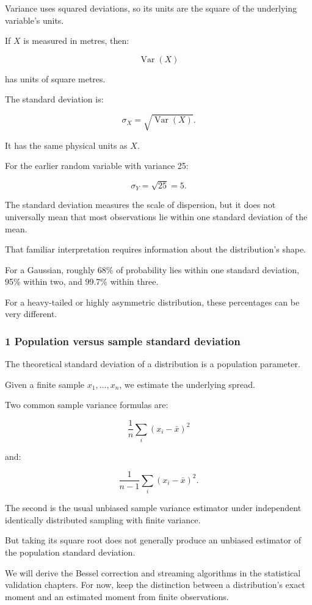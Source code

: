 Variance uses squared deviations, so its units are the square of the underlying variable's units.

If \(X\) is measured in metres, then:

\[
 \operatorname{Var}(X)
\]

has units of square metres.

The standard deviation is:

\[
 \boxed{ \sigma_X=\sqrt{\operatorname{Var}(X)} }.
\]

It has the same physical units as \(X\).

For the earlier random variable with variance 25:

\[
 \sigma_Y=\sqrt{25}=5.
\]

The standard deviation measures the scale of dispersion, but it does not universally mean that most observations lie within one standard deviation of the mean.

That familiar interpretation requires information about the distribution's shape.

For a Gaussian, roughly 68\% of probability lies within one standard deviation, 95\% within two, and 99.7\% within three.

For a heavy-tailed or highly asymmetric distribution, these percentages can be very different.

\subsubsection{1 Population versus sample standard deviation}\label{02-foundations-ii-ch023-population-versus-sample-standard-deviation}

The theoretical standard deviation of a distribution is a population parameter.

Given a finite sample \(x_1,\ldots,x_n\), we estimate the underlying spread.

Two common sample variance formulas are:

\[
 \frac1n\sum_i(x_i-\bar x)^2
\]

and:

\[
 \frac1{n-1}\sum_i(x_i-\bar x)^2.
\]

The second is the usual unbiased sample variance estimator under independent identically distributed sampling with finite variance.

But taking its square root does not generally produce an unbiased estimator of the population standard deviation.

We will derive the Bessel correction and streaming algorithms in the statistical validation chapters. For now, keep the distinction between a distribution's exact moment and an estimated moment from finite observations.

